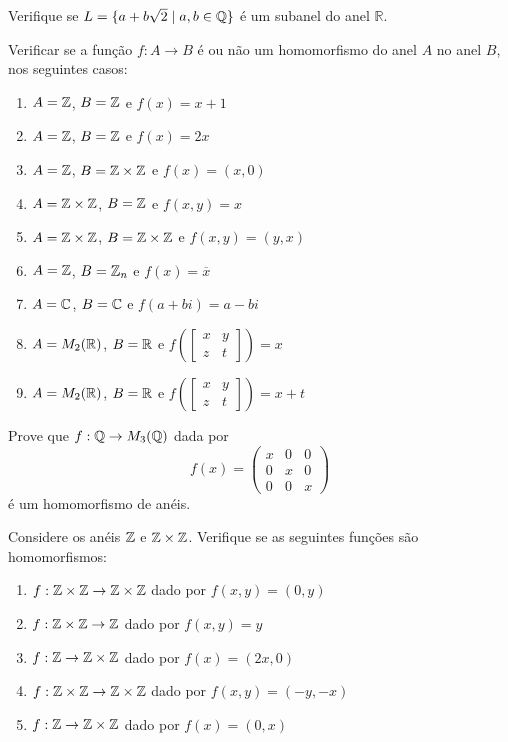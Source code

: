 \documentclass[12pt]{article}
\begin{document}
\questao{}
Verifique se $L = \{ a + b\sqrt{2} \mid a, b \in \mathbb{Q}\}$ {\'e} um subanel
do anel $\mathbb{R}$.


\vesp

	Verificar se a função $f : A \to B$ é ou não um homomorfismo do anel $A$ no anel $B$, nos seguintes casos:
\begin{enumerate}[label=({\alph*})]
\item $A = \mathbb{Z}$, $B = \mathbb{Z}$ e $f(x) = x + 1$
\item $A = \mathbb{Z}$, $B = \mathbb{Z}$ e $f(x) = 2x$
\item $A = \mathbb{Z}$, $B = \mathbb{Z} \times \mathbb{Z}$ e $f(x) = (x, 0)$
\item $A = \mathbb{Z} \times \mathbb{Z}$, $B = \mathbb{Z}$ e $f(x,y) = x$
\item $A = \mathbb{Z} \times \mathbb{Z}$, $B = \mathbb{Z} \times \mathbb{Z}$ e $f(x,y) = (y,x)$
\item $A = \mathbb{Z}$, $B = \mathbb{Z}_n$ e $f(x) = \overline{x}$
\item $A = \mathbb{C}$, $B = \mathbb{C}$ e $f(a + bi) = a - bi$
\item $A = M_2(\mathbb{R})$, $B = \mathbb{R}$ e $f\left(\begin{bmatrix}
	x & y\\z & t
\end{bmatrix}\right) = x$
\item $A = M_2(\mathbb{R})$, $B = \mathbb{R}$ e $f\left(\begin{bmatrix}
	x & y\\z & t
\end{bmatrix}\right) = x + t$
\end{enumerate}


\vesp

\questao{}
	Prove que $f : \mathbb{Q} \to M_3(\mathbb{Q})$ dada por
\[
	f(x) = \begin{pmatrix}
		x & 0 & 0\\
		0 & x & 0\\
		0 & 0 & x
	\end{pmatrix}
\]
é um homomorfismo de anéis.


\vesp

	 Considere os an{\'e}is $\mathbb{Z}$ e $\mathbb{Z}\times \mathbb{Z}$. Verifique se as seguintes funções s{\~a}o homomorfismos:
\begin{enumerate}[label=({\alph*})]
\item $f : \mathbb{Z}\times\mathbb{Z} \to \mathbb{Z}\times\mathbb{Z}$ dado por $f(x,y) = (0,y)$
\item $f : \mathbb{Z}\times\mathbb{Z} \to \mathbb{Z}$ dado por $f(x,y) = y$
\item $f : \mathbb{Z}\to \mathbb{Z}\times\mathbb{Z}$ dado por $f(x) = (2x,0)$
\item $f : \mathbb{Z}\times\mathbb{Z} \to \mathbb{Z}\times\mathbb{Z}$ dado por $f(x,y) = (-y,-x)$
\item $f : \mathbb{Z} \to \mathbb{Z}\times\mathbb{Z}$ dado por $f(x) = (0,x)$
\end{enumerate}
\end{document}
